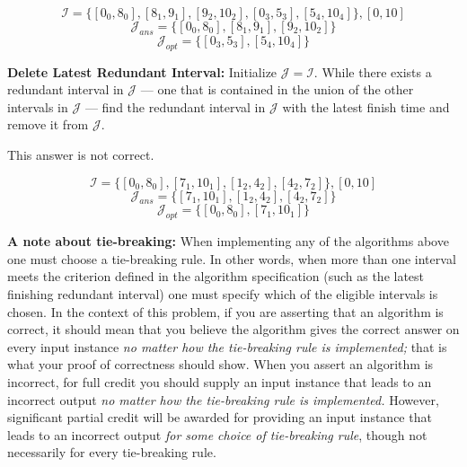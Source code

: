 \documentclass{hw}
\begin{document}
\begin{problem}
\begin{solution}
$$
\mathcal{I} = \{[0_0,8_0], [8_1,9_1], [9_2,10_2], [0_3,5_3], [5_4,10_4]\}, [0,10]
$$
$$
\mathcal{J}_{ans} = \{[0_0,8_0], [8_1,9_1], [9_2,10_2]\}
$$
$$
\mathcal{J}_{opt} = \{[0_3,5_3], [5_4,10_4]\}
$$
\end{solution}
    
\begin{subproblem}
    \textbf{Delete Latest Redundant Interval:}
  Initialize $\mathcal{J}=\mathcal{I}$. While there
  exists a redundant interval in $\mathcal{J}$ --- one
  that is contained in the union of the other intervals
  in $\mathcal{J}$ --- find the redundant interval in
  $\mathcal{J}$ with the latest finish time and remove it
  from $\mathcal{J}$.
\end{subproblem}

\begin{solution}
This answer is not correct.

$$
\mathcal{I} = \{[0_0,8_0],[7_1,10_1],[1_2,4_2],[4_2,7_2]\}, [0,10]
$$
$$
\mathcal{J}_{ans} = \{[7_1,10_1],[1_2,4_2],[4_2,7_2]\}
$$
$$
\mathcal{J}_{opt} = \{[0_0,8_0],[7_1,10_1]\}
$$
\end{solution}

{\bf A note about tie-breaking:}
When implementing any of the algorithms above one must
choose a tie-breaking rule. In other words, when more than
one interval meets the criterion defined in the algorithm
specification (such as the latest finishing redundant
interval) one must specify which of the eligible
intervals is chosen. In the context of this problem,
if you are asserting that an algorithm is correct,
it should mean that you believe the algorithm gives
the correct answer on every input instance
{\em no matter how the tie-breaking rule is implemented;}
that is what your proof of correctness should show.
When you assert an algorithm is incorrect,
for full credit you should supply an input instance
that leads to an incorrect output {\em no matter how
the tie-breaking rule is implemented.} However,
significant partial credit will be awarded for
providing an input instance that leads to an incorrect
output {\em for some choice of tie-breaking rule},
though not necessarily for every tie-breaking rule.

\end{problem}
\newpage

\newcommand{\rank}{\textnormal{rank}}
\newcommand{\Colon}{:}
\newcommand{\dotdot}{..}
\newcommand{\numinv}{\textrm{NI}}
\newcommand{\numlargeinv}{\textrm{NLI}}
\end{document}
